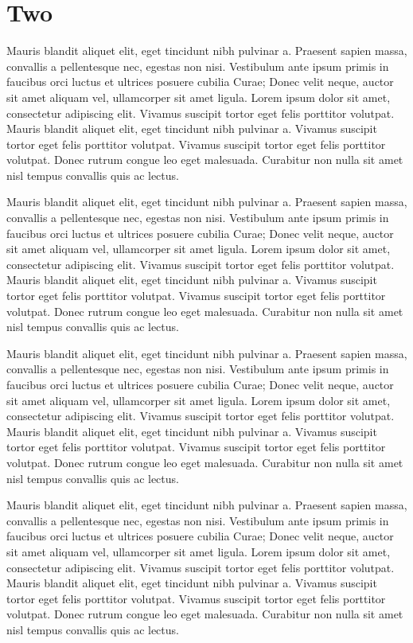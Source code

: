 \documentclass{scrbook}
\begin{document}
\section{Two}\label{c3-c3-two}

Mauris blandit aliquet elit, eget tincidunt nibh pulvinar a. Praesent
sapien massa, convallis a pellentesque nec, egestas non nisi. Vestibulum
ante ipsum primis in faucibus orci luctus et ultrices posuere cubilia
Curae; Donec velit neque, auctor sit amet aliquam vel, ullamcorper sit
amet ligula. Lorem ipsum dolor sit amet, consectetur adipiscing elit.
Vivamus suscipit tortor eget felis porttitor volutpat. Mauris blandit
aliquet elit, eget tincidunt nibh pulvinar a. Vivamus suscipit tortor
eget felis porttitor volutpat. Vivamus suscipit tortor eget felis
porttitor volutpat. Donec rutrum congue leo eget malesuada. Curabitur
non nulla sit amet nisl tempus convallis quis ac lectus.

Mauris blandit aliquet elit, eget tincidunt nibh pulvinar a. Praesent
sapien massa, convallis a pellentesque nec, egestas non nisi. Vestibulum
ante ipsum primis in faucibus orci luctus et ultrices posuere cubilia
Curae; Donec velit neque, auctor sit amet aliquam vel, ullamcorper sit
amet ligula. Lorem ipsum dolor sit amet, consectetur adipiscing elit.
Vivamus suscipit tortor eget felis porttitor volutpat. Mauris blandit
aliquet elit, eget tincidunt nibh pulvinar a. Vivamus suscipit tortor
eget felis porttitor volutpat. Vivamus suscipit tortor eget felis
porttitor volutpat. Donec rutrum congue leo eget malesuada. Curabitur
non nulla sit amet nisl tempus convallis quis ac lectus.

Mauris blandit aliquet elit, eget tincidunt nibh pulvinar a. Praesent
sapien massa, convallis a pellentesque nec, egestas non nisi. Vestibulum
ante ipsum primis in faucibus orci luctus et ultrices posuere cubilia
Curae; Donec velit neque, auctor sit amet aliquam vel, ullamcorper sit
amet ligula. Lorem ipsum dolor sit amet, consectetur adipiscing elit.
Vivamus suscipit tortor eget felis porttitor volutpat. Mauris blandit
aliquet elit, eget tincidunt nibh pulvinar a. Vivamus suscipit tortor
eget felis porttitor volutpat. Vivamus suscipit tortor eget felis
porttitor volutpat. Donec rutrum congue leo eget malesuada. Curabitur
non nulla sit amet nisl tempus convallis quis ac lectus.

Mauris blandit aliquet elit, eget tincidunt nibh pulvinar a. Praesent
sapien massa, convallis a pellentesque nec, egestas non nisi. Vestibulum
ante ipsum primis in faucibus orci luctus et ultrices posuere cubilia
Curae; Donec velit neque, auctor sit amet aliquam vel, ullamcorper sit
amet ligula. Lorem ipsum dolor sit amet, consectetur adipiscing elit.
Vivamus suscipit tortor eget felis porttitor volutpat. Mauris blandit
aliquet elit, eget tincidunt nibh pulvinar a. Vivamus suscipit tortor
eget felis porttitor volutpat. Vivamus suscipit tortor eget felis
porttitor volutpat. Donec rutrum congue leo eget malesuada. Curabitur
non nulla sit amet nisl tempus convallis quis ac lectus.
\end{document}
